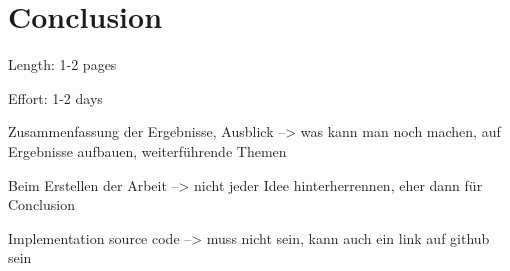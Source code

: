 \chapter{Conclusion}
\label{cha:Chapter5_Conclusion}

Length: 1-2 pages

Effort: 1-2 days


Zusammenfassung der Ergebnisse, Ausblick --> was kann man noch machen, auf Ergebnisse aufbauen, weiterführende Themen

Beim Erstellen der Arbeit --> nicht jeder Idee hinterherrennen, eher dann für Conclusion

Implementation source code --> muss nicht sein, kann auch ein link auf github sein

